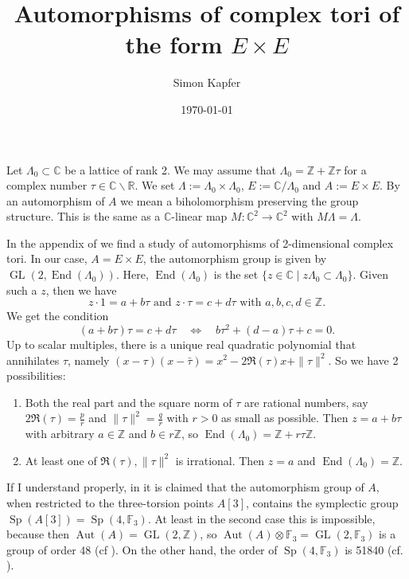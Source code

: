 \documentclass{amsart}
\DeclareMathOperator{\Aut}{Aut}
\DeclareMathOperator{\Sp}{Sp}
\DeclareMathOperator{\GL}{GL}
\DeclareMathOperator{\End}{End}
\newcommand{\C}{\mathbb{C}}
\newcommand{\R}{\mathbb{R}}
\newcommand{\Z}{\mathbb{Z}}
\newcommand{\F}{{\mathbb{ F }_3}}
\theoremstyle{plain}
\theoremstyle{definition}
\theoremstyle{remark}
\begin{document}
\title{Automorphisms of complex tori of the form $E\times E$}

\author{Simon Kapfer}

\date{\today}


\maketitle

Let $\Lambda_0 \subset \C$ be a lattice of rank 2. We may assume that $\Lambda_0 =\Z +\Z\tau$ for a complex number $\tau\in\C\backslash\R$. We set $\Lambda:= \Lambda_0\times\Lambda_0$, $E:=\C/\Lambda_0$ and $A:= E\times E$. By an automorphism of $A$ we mean a biholomorphism preserving the group structure. This is the same as a $\C$-linear map $ M:\C^2 \rightarrow \C^2$ with $M\Lambda =\Lambda$. 

In the appendix of \cite{Ghys} we find a study of automorphisms of 2-dimensional complex tori. In our case, $A=E\times E$, the automorphism group is given by $\GL(2,\End(\Lambda_0))$.
Here, $\End(\Lambda_0)$ is the set $\{z\in\C \;|\; z\Lambda_0\subset \Lambda_0\}$. Given such a $z$, then we have $$z\cdot 1 = a + b\tau\text{ and }z\cdot \tau = c+ d\tau\text{ with }a,b,c,d\in \Z.$$ 
We get the condition
$$
(a+b\tau)\tau = c+d\tau\quad \Leftrightarrow \quad b\tau^2 + (d-a)\tau +c =0.
$$
Up to scalar multiples, there is a unique real quadratic polynomial that annihilates $\tau$, namely $ (x -\tau )(x-\bar{\tau})=x^2 - 2\Re(\tau)x+ \|\tau\|^2$. So we have 2 possibilities:
\begin{enumerate}
 \item Both the real part and the square norm of $\tau$ are rational numbers, say $2\Re(\tau) = \frac{p}{r}$ and $\|\tau\|^2 = \frac{q}{r}$ with $r>0$ as small as possible. Then $z=a+b\tau$ with arbitrary $a\in \Z$ and $b\in r\Z$, so $\End(\Lambda_0)= \Z+ r\tau\Z$.
 \item At least one of $\Re(\tau), \|\tau\|^2$ is irrational. Then $z=a $ and $\End(\Lambda_0)=\Z$.
\end{enumerate}
\vspace{0.5cm}


If I understand properly, in \cite[proof of Prop.~5.2]{Hassett} it is claimed that the automorphism group of $A$, when restricted to the three-torsion points $A[3]$, contains the symplectic group $\Sp (A[3])=\Sp (4,\F )$. At least in the second case this is impossible, because then $\Aut(A) =\GL(2,\Z)$, so $\Aut(A)\otimes\F =\GL(2,\F)$ is a group of order 48 (cf \cite{GL}). On the other hand, the order of $\Sp(4,\F)$ is 51840 (cf. \cite{Sp}).
\end{document}
